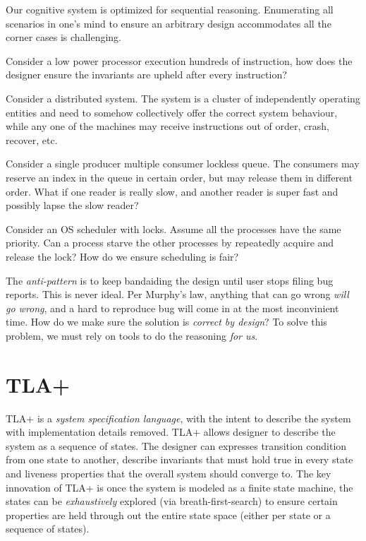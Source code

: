 Our cognitive system is optimized for sequential reasoning. Enumerating all
scenarios in one's mind to ensure an arbitrary design accommodates all the
corner cases is challenging.\newline

Consider a low power processor execution hundreds of instruction, how does the 
designer ensure the invariants are upheld after every instruction?\newline

Consider a distributed system. The system is a cluster of independently
operating entities and need to somehow collectively offer the correct system
behaviour, while any one of the machines may receive instructions out of order,
crash, recover, etc. \newline

Consider a single producer multiple consumer lockless queue. The consumers may 
reserve an index in the queue in certain order, but may release them in different order. 
What if one reader is really slow, and another reader is super fast and possibly 
lapse the slow reader? \newline

Consider an OS scheduler with locks. Assume all the processes have the same
priority. Can a process starve the other processes by repeatedly acquire and
release the lock? How do we ensure scheduling is fair?\newline


The \textit{anti-pattern} is to keep bandaiding the design until user stops
filing bug reports. This is never ideal. Per Murphy's law, anything that can go
wrong \textit{will go wrong}, and a hard to reproduce bug will come in at the
most inconvinient time. How do we make sure the solution is \textit{correct by
design}? To solve this problem, we must rely on tools to do the reasoning
\textit{for us}.

\section{TLA+}

TLA+ is a \textit{system specification language}, with the intent to describe
the system with implementation details removed. TLA+ allows designer to describe
the system as a sequence of states. The designer can expresses transition
condition from one state to another, describe invariants that must hold true in
every state and liveness properties that the overall system should converge to.
The key innovation of TLA+ is once the system is modeled as a finite state
machine, the states can be \textit{exhaustively} explored (via
breath-first-search) to ensure certain properties are held through out the
entire state space (either per state or a sequence of states).\newline

